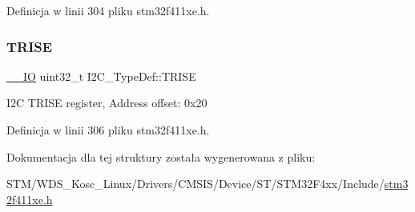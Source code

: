Definicja w linii 304 pliku stm32f411xe.\+h.

\mbox{\label{struct_i2_c___type_def_a9f1a5aee4a26b2fb30e08f88586c436d}} 
\subsubsection{\texorpdfstring{T\+R\+I\+SE}{TRISE}}
{\footnotesize\ttfamily \hyperlink{core__sc300_8h_aec43007d9998a0a0e01faede4133d6be}{\+\_\+\+\_\+\+IO} uint32\+\_\+t I2\+C\+\_\+\+Type\+Def\+::\+T\+R\+I\+SE}

I2C T\+R\+I\+SE register, Address offset\+: 0x20 

Definicja w linii 306 pliku stm32f411xe.\+h.



Dokumentacja dla tej struktury została wygenerowana z pliku\+:\begin{DoxyCompactItemize}
\item 
S\+T\+M/\+W\+D\+S\+\_\+\+Kosc\+\_\+\+Linux/\+Drivers/\+C\+M\+S\+I\+S/\+Device/\+S\+T/\+S\+T\+M32\+F4xx/\+Include/\hyperlink{stm32f411xe_8h}{stm32f411xe.\+h}\end{DoxyCompactItemize}
